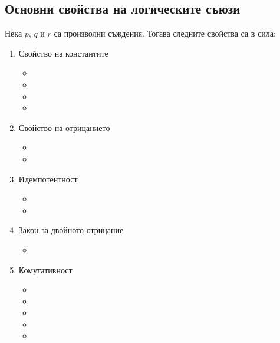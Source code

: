 \subsection{Основни свойства на логическите съюзи}
Нека \(p\), \(q\) и \(r\) са произволни съждения. Тогава следните свойства са в сила:
\begin{enumerate}
    \item Свойство на константите
        \begin{itemize}
            \item {}
            \item {}
            \item {}
            \item {}
        \end{itemize}
    \item Свойство на отрицанието
        \begin{itemize}
            \item {}
            \item {}
        \end{itemize}
    \item Идемпотентност
        \begin{itemize}
            \item {}
            \item {}
        \end{itemize}
    \item Закон за двойното отрицание
        \begin{itemize}
            \item {}
        \end{itemize}
    \item Комутативност
        \begin{itemize}
            \item {}
            \item {}
            \item {}
            \item {}
            \item {}
        \end{itemize}

\end{enumerate}
